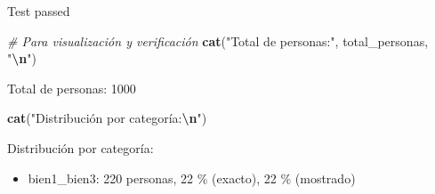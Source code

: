 \documentclass[
]{article}
\newenvironment{Shaded}{\begin{snugshade}}{\end{snugshade}}
\newcommand{\CommentTok}[1]{\textcolor[rgb]{0.56,0.35,0.01}{\textit{#1}}}
\newcommand{\FunctionTok}[1]{\textcolor[rgb]{0.13,0.29,0.53}{\textbf{#1}}}
\newcommand{\NormalTok}[1]{#1}
\newcommand{\SpecialCharTok}[1]{\textcolor[rgb]{0.81,0.36,0.00}{\textbf{#1}}}
\newcommand{\StringTok}[1]{\textcolor[rgb]{0.31,0.60,0.02}{#1}}
\providecommand{\tightlist}{%
  \setlength{\itemsep}{0pt}\setlength{\parskip}{0pt}}
\begin{document}
Test passed

\begin{Shaded}
\begin{Highlighting}[]
\CommentTok{\# Para visualización y verificación}
\FunctionTok{cat}\NormalTok{(}\StringTok{"Total de personas:"}\NormalTok{, total\_personas, }\StringTok{"}\SpecialCharTok{\textbackslash{}n}\StringTok{"}\NormalTok{)}
\end{Highlighting}
\end{Shaded}

Total de personas: 1000

\begin{Shaded}
\begin{Highlighting}[]
\FunctionTok{cat}\NormalTok{(}\StringTok{"Distribución por categoría:}\SpecialCharTok{\textbackslash{}n}\StringTok{"}\NormalTok{)}
\end{Highlighting}
\end{Shaded}

Distribución por categoría:

\begin{Shaded}
\end{Shaded}

\begin{itemize}
\tightlist
\item
  bien1\_bien3: 220 personas, 22 \% (exacto), 22 \% (mostrado)
\end{itemize}

\begin{Shaded}
\end{Shaded}
\end{document}
